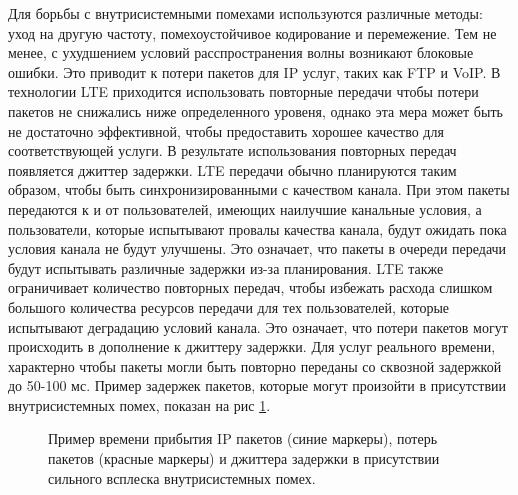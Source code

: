 Для борьбы с внутрисистемными помехами используются различные методы: уход на другую частоту, помехоустойчивое кодирование и перемежение. Тем не менее, с ухудшением условий расспространения волны возникают блоковые ошибки. Это приводит к потери пакетов для IP услуг, таких как FTP и VoIP. В технологии LTE приходится использовать повторные передачи чтобы потери пакетов не снижались ниже определенного уровеня, однако эта мера может быть не достаточно эффективной, чтобы предоставить хорошее качество для соответствующей услуги. В результате использования повторных передач появляется джиттер задержки.
LTE передачи обычно планируются таким образом, чтобы быть синхронизированными с качеством канала. При этом пакеты передаются к и от пользователей, имеющих наилучшие канальные условия, а пользователи, которые испытывают провалы качества канала, будут ожидать пока условия канала не будут улучшены. Это означает, что пакеты в очереди передачи будут испытывать различные задержки из-за планирования.
LTE также ограничивает количество повторных передач, чтобы избежать расхода слишком большого количества ресурсов передачи для тех пользователей, которые испытывают деградацию условий канала. Это означает, что потери пакетов могут происходить в дополнение к джиттеру задержки. Для услуг реального времени, характерно чтобы пакеты могли быть повторно переданы со сквозной задержкой до 50-100 мс.
Пример задержек пакетов, которые могут произойти в присутствии внутрисистемных помех, показан на рис \ref{img:example_inter}.


\pgfplotsset{width=15cm, height=10cm, compat=1.3}
\begin{figure} [h]
  \center
{}
\caption{Пример времени прибытия IP пакетов (синие маркеры), потерь пакетов (красные маркеры) и джиттера задержки в присутствии сильного всплеска внутрисистемных помех.}
  \label{img:example_inter}
\end{figure}



